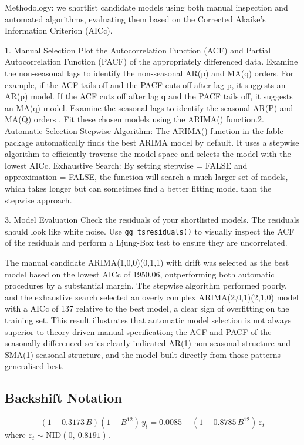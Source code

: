 \documentclass[11pt, a4paper]{article}\usepackage[]{graphicx}\usepackage[]{xcolor}
\begin{document}
Methodology: we shortlist candidate models using both manual inspection and automated algorithms, evaluating them based on the Corrected Akaike's Information Criterion (AICc).  

1. Manual Selection Plot the Autocorrelation Function (ACF) and Partial Autocorrelation Function (PACF) of the appropriately differenced data.  Examine the non-seasonal lags to identify the non-seasonal AR(p) and MA(q) orders. For example, if the ACF tails off and the PACF cuts off after lag p, it suggests an AR(p) model. If the ACF cuts off after lag q and the PACF tails off, it suggests an MA(q) model.  Examine the seasonal lags to identify the seasonal AR(P) and MA(Q) orders .  Fit these chosen models using the ARIMA() function.2. Automatic Selection Stepwise Algorithm: The ARIMA() function in the fable package automatically finds the best ARIMA model by default. It uses a stepwise algorithm to efficiently traverse the model space and selects the model with the lowest AICc.  Exhaustive Search: By setting stepwise = FALSE and approximation = FALSE, the function will search a much larger set of models, which takes longer but can sometimes find a better fitting model than the stepwise approach.  

3. Model Evaluation Check the residuals of your shortlisted models. The residuals should look like white noise. Use \texttt{gg\_tsresiduals()} to visually inspect the ACF of the residuals and perform a Ljung-Box test to ensure they are uncorrelated. 

The manual candidate ARIMA(1,0,0)(0,1,1) with drift was selected as the best model based on the lowest AICc of 1950.06, outperforming both automatic procedures by a substantial margin. The stepwise algorithm performed poorly, and the exhaustive search selected an overly complex ARIMA(2,0,1)(2,1,0) model with a AICc of 137 relative to the best model, a clear sign of overfitting on the training set. This result illustrates that automatic model selection is not always superior to theory-driven manual specification; the ACF and PACF of the seasonally differenced series clearly indicated AR(1) non-seasonal structure and SMA(1) seasonal structure, and the model built directly from those patterns generalised best.

\subsection{Backshift Notation}

\[
(1 - 0.3173\,B)(1 - B^{12})\,y_t 
= 0.0085 + (1 - 0.8785\,B^{12})\,\varepsilon_t
\]
where $\varepsilon_t \sim \mathrm{NID}(0,\ 0.8191)$.
\end{document}
